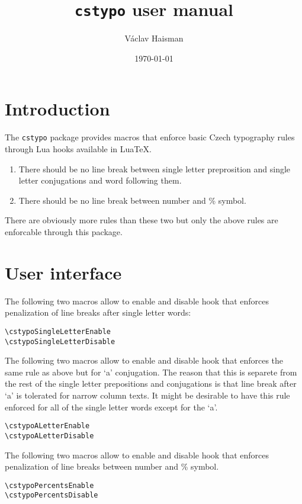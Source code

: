 \documentclass{article}
\author{Václav Haisman}
\date{\today}
\title{\texttt{cstypo} user manual}
\begin{document}
\begin{titlepage}
  \maketitle
\end{titlepage}

\section{Introduction}
The \texttt{cstypo} package provides macros that enforce basic Czech
typography rules through Lua hooks available in LuaTeX.

\begin{enumerate}%
\item\label{itm:singleletter} There should be no line break between single
  letter preprosition and single letter conjugations and word following them.
\item\label{itm:percents} There should be no line break between number and \%
  symbol.
\end{enumerate}

There are obviously more rules than these two but only the above rules are
enforcable through this package.

\section{User interface}

The following two macros allow to enable and disable hook that enforces
penalization of line breaks after single letter words:

\begin{lstlisting}[style=myLatexStyle]
\cstypoSingleLetterEnable
\cstypoSingleLetterDisable
\end{lstlisting}

The following two macros allow to enable and disable hook that enforces the
same rule as above but for ‘a’ conjugation. The reason that this is separete
from the rest of the single letter prepositions and conjugations is that line
break after ‘a’ is tolerated for narrow column texts. It might be desirable
to have this rule enforced for all of the single letter words except for the
‘a’.

\begin{lstlisting}[style=myLatexStyle]
\cstypoALetterEnable
\cstypoALetterDisable
\end{lstlisting}

The following two macros allow to enable and disable hook that enforces
penalization of line breaks between number and \% symbol.

\begin{lstlisting}[style=myLatexStyle]
\cstypoPercentsEnable
\cstypoPercentsDisable
\end{lstlisting}
\end{document}
